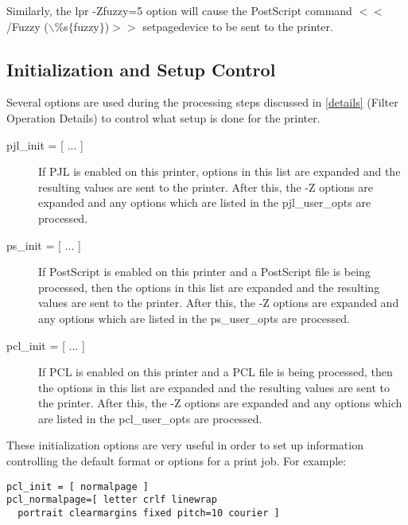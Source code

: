 \documentclass[a4paper]{article}
\begin{document}
Similarly,
the {\ttfamily lpr -Zfuzzy=5} option will cause the PostScript command
{\ttfamily  $<$$<$/Fuzzy ($\backslash$\%s$\{$fuzzy$\}$)$>$$>$ setpagedevice }
to be sent to the printer.




\subsection{Initialization and Setup Control}

Several options are used during
the processing steps discussed in
\ref{details} {(Filter Operation Details)}
to control what setup is done for the printer.
\begin{description}
\item[pjl\_init = {[} ... {]}] \mbox{}

If PJL is enabled on this printer,
options in this list are expanded and the resulting values
are sent to the printer.
After this,
the -Z options are expanded and any options which
are listed in the {\ttfamily pjl\_user\_opts} are processed.



\item[ps\_init = {[} ... {]}] \mbox{}

If PostScript is enabled on this printer and a PostScript file
is being processed,
then the
options in this list are expanded and the resulting values
are sent to the printer.
After this,
the -Z options are expanded and any options which
are listed in the {\ttfamily ps\_user\_opts} are processed.



\item[pcl\_init = {[} ... {]}] \mbox{}

If PCL is enabled on this printer and a PCL file
is being processed,
then the
options in this list are expanded and the resulting values
are sent to the printer.
After this,
the -Z options are expanded and any options which
are listed in the {\ttfamily pcl\_user\_opts} are processed.

\end{description}


These initialization options are very useful in order to set up
information controlling the default format or options for a
print job.
For example:
\begin{tscreen}
\begin{verbatim}
pcl_init = [ normalpage ]
pcl_normalpage=[ letter crlf linewrap
  portrait clearmargins fixed pitch=10 courier ]
\end{verbatim}
\end{tscreen}
\end{document}

